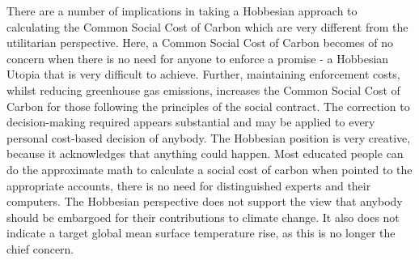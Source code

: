 \documentclass[11pt, oneside]{article}   	%
\begin{document}
There are a number of implications in taking a Hobbesian approach to calculating the Common Social Cost of Carbon which are very different from the utilitarian perspective.
Here, a Common Social Cost of Carbon becomes of no concern when there is no need for anyone to enforce a promise - a Hobbesian Utopia that is very difficult to achieve.
Further, maintaining enforcement costs, whilst reducing greenhouse gas emissions, increases the Common Social Cost of Carbon for those following the principles of the social contract.
The correction to decision-making required appears substantial and may be applied to every personal cost-based decision of anybody.
The Hobbesian position is very creative, because it acknowledges that anything could happen.
Most educated people can do the approximate math to calculate a social cost of carbon when pointed to the appropriate accounts, there is no need for distinguished experts and their computers.
The Hobbesian perspective does not support the view that anybody should be embargoed for their contributions to climate change.
It also does not indicate a target global mean surface temperature rise, as this is no longer the chief concern.\
\end{document}
